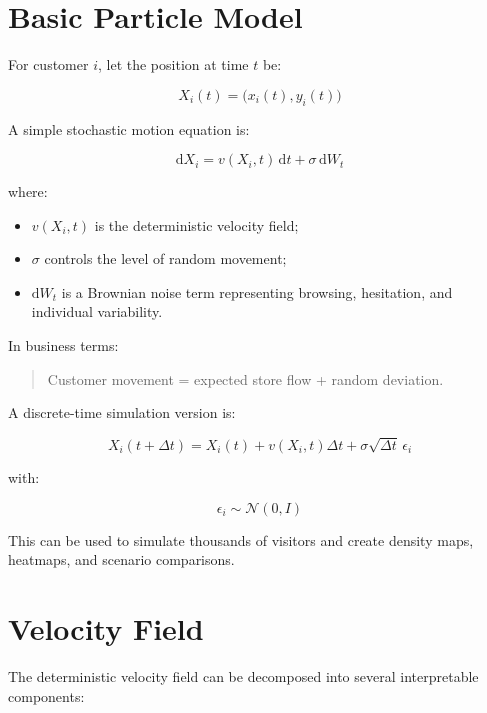 \documentclass[11pt,a4paper]{article}
\begin{document}
\section{Basic Particle Model}

For customer $i$, let the position at time $t$ be:

\begin{equation}
X_i(t) = \bigl(x_i(t), y_i(t)\bigr)
\end{equation}

A simple stochastic motion equation is:

\begin{equation}
\mathrm{d}X_i = v(X_i,t)\,\mathrm{d}t + \sigma\,\mathrm{d}W_t
\end{equation}

where:

\begin{itemize}[leftmargin=*]
    \item $v(X_i,t)$ is the deterministic velocity field;
    \item $\sigma$ controls the level of random movement;
    \item $\mathrm{d}W_t$ is a Brownian noise term representing browsing, hesitation, and individual variability.
\end{itemize}

In business terms:

\begin{quote}
Customer movement = expected store flow + random deviation.
\end{quote}

A discrete-time simulation version is:

\begin{equation}
X_i(t+\Delta t) = X_i(t) + v(X_i,t)\Delta t + \sigma \sqrt{\Delta t}\,\epsilon_i
\end{equation}

with:

\begin{equation}
\epsilon_i \sim \mathcal{N}(0,I)
\end{equation}

This can be used to simulate thousands of visitors and create density maps, heatmaps, and scenario comparisons.

\section{Velocity Field}

The deterministic velocity field can be decomposed into several interpretable components:
\end{document}
